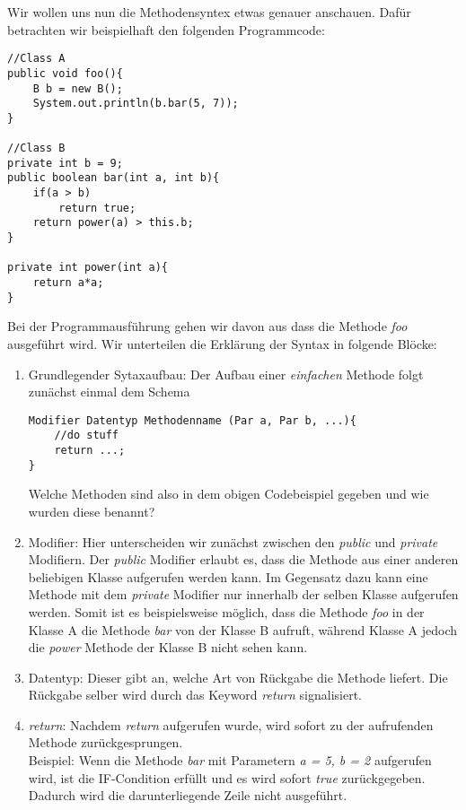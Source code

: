 \begin{Infobox}
    Wir wollen uns nun die Methodensyntex etwas genauer anschauen. Dafür betrachten wir beispielhaft den folgenden Programmcode:
    \begin{lstlisting}[breaklines=true, numbers=none]
//Class A
public void foo(){
    B b = new B();
    System.out.println(b.bar(5, 7));
}

//Class B
private int b = 9;
public boolean bar(int a, int b){
    if(a > b)
        return true;
    return power(a) > this.b;
}

private int power(int a){
    return a*a;
}
\end{lstlisting}
Bei der Programmausführung gehen wir davon aus dass die Methode \textit{foo} ausgeführt wird. Wir unterteilen die Erklärung der Syntax in folgende Blöcke:
\begin{enumerate}[label=\roman*)]
    \item 
    Grundlegender Sytaxaufbau: Der Aufbau einer \textit{einfachen} Methode folgt zunächst einmal dem Schema 
    \begin{lstlisting}
Modifier Datentyp Methodenname (Par a, Par b, ...){
    //do stuff
    return ...;
}
    \end{lstlisting}
    Welche Methoden sind also in dem obigen Codebeispiel gegeben und wie wurden diese benannt?
    \item Modifier: Hier unterscheiden wir zunächst zwischen den \textit{public} und \textit{private} Modifiern. Der \textit{public} Modifier erlaubt es, dass die Methode aus einer
    anderen beliebigen Klasse aufgerufen werden kann. Im Gegensatz dazu kann eine Methode mit dem \textit{private} Modifier nur innerhalb der selben Klasse aufgerufen werden.
    Somit ist es beispielsweise möglich, dass die Methode \textit{foo} in der Klasse A die Methode \textit{bar} von der Klasse B aufruft, während Klasse A jedoch die \textit{power} Methode
    der Klasse B nicht sehen kann.
    \item Datentyp: Dieser gibt an, welche Art von Rückgabe die Methode liefert. Die Rückgabe selber wird durch das Keyword \textit{return} signalisiert.
    \item \textit{return}:
    Nachdem \textit{return} aufgerufen wurde, wird sofort zu der aufrufenden Methode zurückgesprungen.\\
    Beispiel: Wenn die Methode \textit{bar} mit Parametern \textit{a = 5, b = 2} aufgerufen wird, ist die IF-Condition erfüllt und es wird sofort \textit{true} zurückgegeben.
    Dadurch wird die darunterliegende Zeile nicht ausgeführt.
\end{enumerate}

\end{Infobox}
